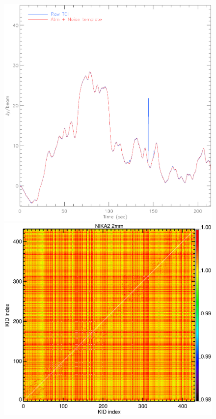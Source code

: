 \begin{figure}[hhh]
\begin{center}
\includegraphics[clip, angle=0, scale=0.4]{Figures/toi_plot_decorr.eps}
\includegraphics[clip, angle=0, scale=0.4]{Figures/matrix_2mm_raw.eps}

\end{center}
\end{figure}
